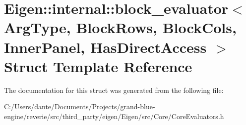 \hypertarget{struct_eigen_1_1internal_1_1block__evaluator}{}\section{Eigen\+::internal\+::block\+\_\+evaluator$<$ Arg\+Type, Block\+Rows, Block\+Cols, Inner\+Panel, Has\+Direct\+Access $>$ Struct Template Reference}
\label{struct_eigen_1_1internal_1_1block__evaluator}


The documentation for this struct was generated from the following file\+:\begin{DoxyCompactItemize}
\item 
C\+:/\+Users/dante/\+Documents/\+Projects/grand-\/blue-\/engine/reverie/src/third\+\_\+party/eigen/\+Eigen/src/\+Core/Core\+Evaluators.\+h\end{DoxyCompactItemize}
